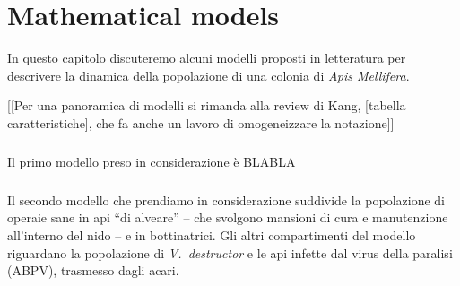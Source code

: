 \chapter{Mathematical models}
In questo capitolo discuteremo alcuni modelli proposti in letteratura per descrivere la dinamica della popolazione di una colonia di \emph{Apis Mellifera}.

[[Per una panoramica di modelli si rimanda alla review di Kang, [tabella caratteristiche], che fa anche un lavoro di omogeneizzare la notazione]]

\paragraph{}
Il primo modello preso in considerazione è \parencite{khoury2011} BLABLA

\paragraph{}
Il secondo modello che prendiamo in considerazione \parencite{ratti2017} suddivide la popolazione di operaie sane in api ``di alveare'' -- che svolgono mansioni di cura e manutenzione all'interno del nido -- e in bottinatrici.
Gli altri compartimenti del modello riguardano la popolazione di \emph{V.~destructor} e le api infette dal virus della paralisi (ABPV), trasmesso dagli acari.



% 
